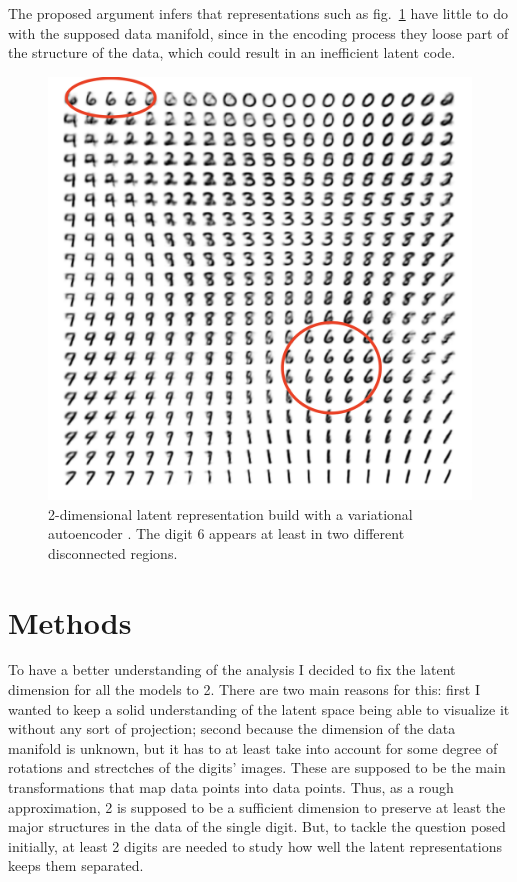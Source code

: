 \documentclass[twocolumn,gsifonts,twoside]{gsipaper}
\begin{document}
The proposed argument infers that representations such as fig.~\ref{fig:vae} have little to do with the supposed data manifold, since in the encoding process they loose part of the structure of the data, which could result in an inefficient latent code.

\begin{figure}
  \centering
  \includegraphics[width=.6\linewidth]{image_from_vae.png}
  \caption{2-dimensional latent representation build with a variational autoencoder \cite{Kingma2022}. The digit 6 appears at least in two different disconnected regions.}
  \label{fig:vae}
\end{figure}


\section{Methods}
To have a better understanding of the analysis I decided to fix the latent dimension for all the models to 2. There are two main reasons for this: first I wanted to keep a solid understanding of the latent space being able to visualize it without any sort of projection; second because the dimension of the data manifold is unknown, but it has to at least take into account for some degree of rotations and strectches of the digits' images. These are supposed to be the main transformations that map data points into data points. Thus, as a rough approximation, 2 is supposed to be a sufficient dimension to preserve at least the major structures in the data of the single digit. But, to tackle the question posed initially, at least 2 digits are needed to study how well the latent representations keeps them separated.
\end{document}
